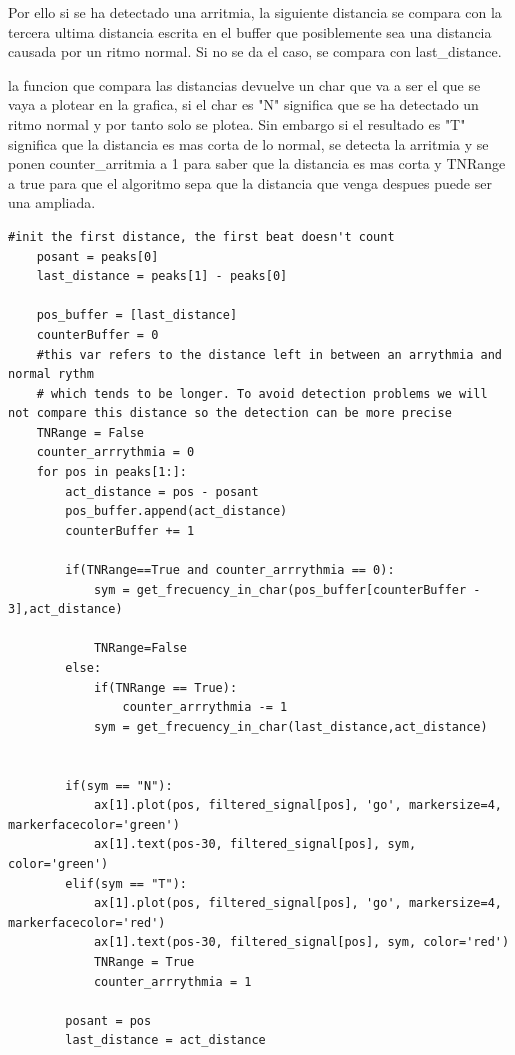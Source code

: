 Por ello si se ha detectado una arritmia, la siguiente distancia se compara con
la tercera ultima distancia escrita en el buffer que posiblemente sea una distancia causada por un ritmo normal. 
Si no se da el caso, se compara con last\_distance.

la funcion que compara las distancias devuelve un char que va a ser el que se vaya a plotear en la grafica, 
si el char es "N" significa que se ha detectado un ritmo normal y por tanto solo se plotea. Sin embargo si el 
resultado es "T" significa que la distancia es mas corta de lo normal, se detecta la arritmia y se ponen
counter\_arritmia a 1 para saber que la distancia es mas corta y TNRange a true para que el algoritmo sepa 
que la distancia que venga despues puede ser una ampliada. 

\lstset{language=python, breaklines=true, basicstyle=\footnotesize}
\begin{lstlisting}[frame=single]
    #init the first distance, the first beat doesn't count
    posant = peaks[0]
    last_distance = peaks[1] - peaks[0]

    pos_buffer = [last_distance]
    counterBuffer = 0
    #this var refers to the distance left in between an arrythmia and normal rythm 
    # which tends to be longer. To avoid detection problems we will not compare this distance so the detection can be more precise
    TNRange = False
    counter_arrrythmia = 0
    for pos in peaks[1:]:
        act_distance = pos - posant
        pos_buffer.append(act_distance)
        counterBuffer += 1
    
        if(TNRange==True and counter_arrrythmia == 0):
            sym = get_frecuency_in_char(pos_buffer[counterBuffer - 3],act_distance)
    
            TNRange=False
        else:
            if(TNRange == True):
                counter_arrrythmia -= 1
            sym = get_frecuency_in_char(last_distance,act_distance)
        
    
        if(sym == "N"):
            ax[1].plot(pos, filtered_signal[pos], 'go', markersize=4, markerfacecolor='green')
            ax[1].text(pos-30, filtered_signal[pos], sym, color='green')       
        elif(sym == "T"):
            ax[1].plot(pos, filtered_signal[pos], 'go', markersize=4, markerfacecolor='red')
            ax[1].text(pos-30, filtered_signal[pos], sym, color='red')
            TNRange = True
            counter_arrrythmia = 1
        
        posant = pos
        last_distance = act_distance
\end{lstlisting}

